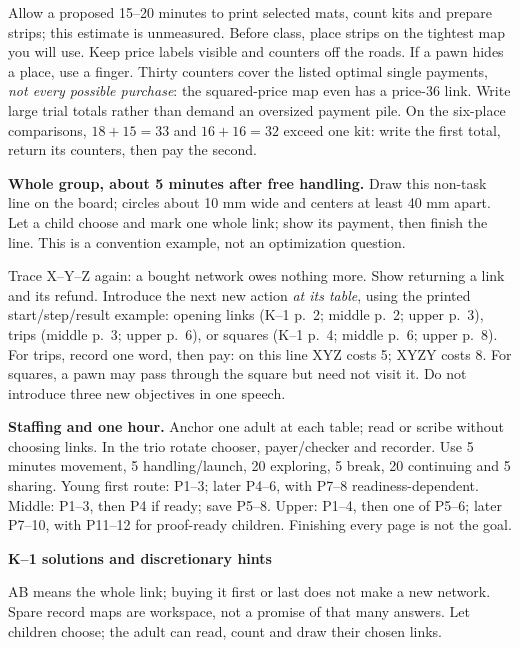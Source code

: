 \documentclass[11pt]{article}
\newcommand{\head}[1]{\par{\large\bfseries #1}\par}
\begin{document}
Allow a proposed 15--20 minutes to print selected mats, count kits and prepare strips; this estimate is unmeasured. Before class, place strips on the tightest map you will use. Keep price labels visible and counters off the roads. If a pawn hides a place, use a finger. Thirty counters cover the listed optimal single payments, \emph{not every possible purchase}: the squared-price map even has a price-36 link. Write large trial totals rather than demand an oversized payment pile. On the six-place comparisons, $18+15=33$ and $16+16=32$ exceed one kit: write the first total, return its counters, then pay the second.

\textbf{Whole group, about 5 minutes after free handling.} Draw this non-task line on the board; circles about 10 mm wide and centers at least 40 mm apart. Let a child choose and mark one whole link; show its payment, then finish the line. This is a convention example, not an optimization question.
\begin{center}
\end{center}
Trace X--Y--Z again: a bought network owes nothing more. Show returning a link and its refund. Introduce the next new action \emph{at its table}, using the printed start/step/result example: opening links (K--1 p.~2; middle p.~2; upper p.~3), trips (middle p.~3; upper p.~6), or squares (K--1 p.~4; middle p.~6; upper p.~8). For trips, record one word, then pay: on this line XYZ costs 5; XYZY costs 8. For squares, a pawn may pass through the square but need not visit it. Do not introduce three new objectives in one speech.

\textbf{Staffing and one hour.} Anchor one adult at each table; read or scribe without choosing links. In the trio rotate chooser, payer/checker and recorder. Use 5 minutes movement, 5 handling/launch, 20 exploring, 5 break, 20 continuing and 5 sharing. Young first route: P1--3; later P4--6, with P7--8 readiness-dependent. Middle: P1--3, then P4 if ready; save P5--8. Upper: P1--4, then one of P5--6; later P7--10, with P11--12 for proof-ready children. Finishing every page is not the goal.
\newpage
\head{K--1 solutions and discretionary hints}
AB means the whole link; buying it first or last does not make a new network. Spare record maps are workspace, not a promise of that many answers. Let children choose; the adult can read, count and draw their chosen links.
\end{document}
